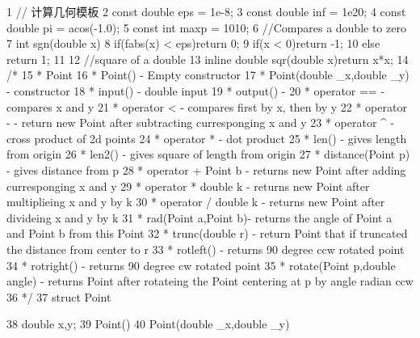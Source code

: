 \documentclass[11pt]{article}
\begin{document}
\begin{Code}
 1   // 计算几何模板
 2   const double eps = 1e-8;
 3   const double inf = 1e20;
 4   const double pi = acos(-1.0);
 5   const int maxp = 1010;
 6   //Compares a double to zero
 7   int sgn(double x){
 8        if(fabs(x) < eps)return 0;
 9        if(x < 0)return -1;
10        else return 1;
11   }
12   //square of a double
13   inline double sqr(double x){return x*x;}
14   /*
15     * Point
16     * Point()               - Empty constructor
17     * Point(double _x,double _y) - constructor
18     * input()             - double input
19     * output()            - %
20     * operator ==         - compares x and y
21     * operator <          - compares first by x, then by y
22     * operator -          - return new Point after subtracting
          curresponging x and y
23     * operator ^          - cross product of 2d points
24     * operator *          - dot product
25     * len()               - gives length from origin
26     * len2()              - gives square of length from origin
27     * distance(Point p)   - gives distance from p
28     * operator + Point b - returns new Point after adding
          curresponging x and y
29     * operator * double k - returns new Point after multiplieing x and
           y by k
30     * operator / double k - returns new Point after divideing x and y
          by k
31     * rad(Point a,Point b)- returns the angle of Point a and Point b
          from this Point
32     * trunc(double r)     - return Point that if truncated the
          distance from center to r
33     * rotleft()           - returns 90 degree ccw rotated point
34     * rotright()          - returns 90 degree cw rotated point
35     * rotate(Point p,double angle) - returns Point after rotateing the
           Point centering at p by angle radian ccw
36     */
37   struct Point{
38        double x,y;
39        Point(){}
40        Point(double _x,double _y){


}}
\end{Code}
\end{document}
